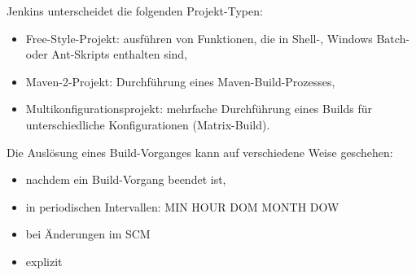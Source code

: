 Jenkins unterscheidet die folgenden Projekt-Typen:
\begin{itemize}
\item Free-Style-Projekt: ausführen von Funktionen, die in Shell-,
  Windows Batch- oder Ant-Skripts enthalten sind,
\item Maven-2-Projekt: Durchführung eines Maven-Build-Prozesses,
\item Multikonfigurationsprojekt: mehrfache Durchführung
  eines Builds für unterschiedliche Konfigurationen (Matrix-Build).
\end{itemize}
Die Auslösung eines Build-Vorganges kann auf verschiedene Weise
geschehen:
\begin{itemize}
\item nachdem ein Build-Vorgang beendet ist,
\item in periodischen Intervallen: MIN HOUR DOM MONTH DOW
\item bei Änderungen im SCM
\item explizit
\end{itemize}
%
%
\newslide
